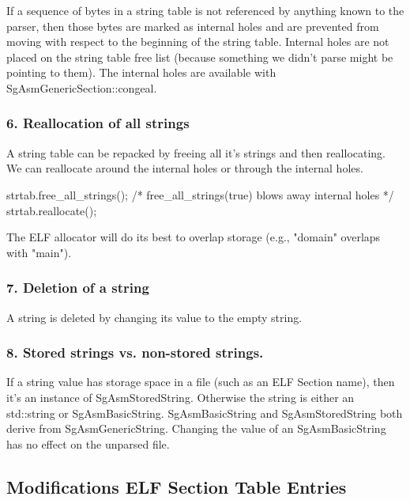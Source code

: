    If a sequence of bytes in a string table is not referenced by anything known to the parser, then those bytes are marked as
   internal holes and are prevented from moving with respect to the beginning of the string table. Internal holes are not
   placed on the string table free list (because something we didn't parse might be pointing to them).  The internal holes are
   available with SgAsmGenericSection::congeal.

\subsubsection{6. Reallocation of all strings}

   A string table can be repacked by freeing all it's strings and then reallocating.  We can reallocate around the internal
   holes or through the internal holes.

       strtab.free\_all\_strings();   /* free\_all\_strings(true) blows away internal holes */
       strtab.reallocate();

   The ELF allocator will do its best to overlap storage (e.g., "domain" overlaps with "main").

\subsubsection{7. Deletion of a string}

   A string is deleted by changing its value to the empty string.

\subsubsection{8. Stored strings vs. non-stored strings.}

   If a string value has storage space in a file (such as an ELF Section name), then it's an instance of
   SgAsmStoredString. Otherwise the string is either an std::string or SgAsmBasicString. SgAsmBasicString and SgAsmStoredString
   both derive from SgAsmGenericString.  Changing the value of an SgAsmBasicString has no effect on the unparsed file.

\subsection{Modifications ELF Section Table Entries}

